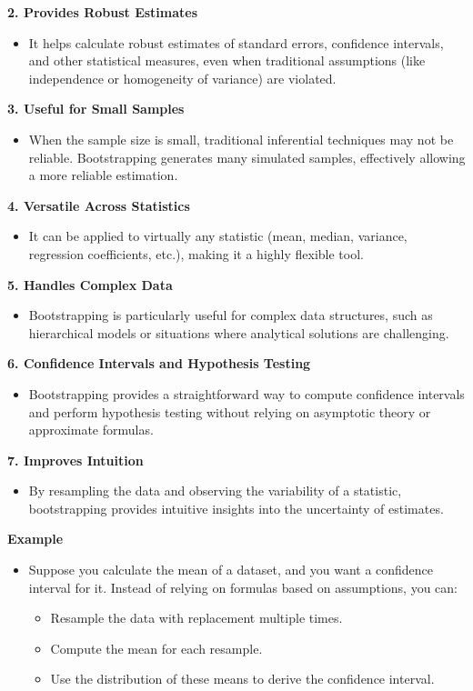 \begin{enumerate}
\textbf{2. Provides Robust Estimates}
\begin{itemize}
    \item It helps calculate robust estimates of standard errors, confidence intervals, and other statistical measures, even when traditional assumptions (like independence or homogeneity of variance) are violated.
\end{itemize}

\textbf{3. Useful for Small Samples}
\begin{itemize}
    \item When the sample size is small, traditional inferential techniques may not be reliable. Bootstrapping generates many simulated samples, effectively allowing a more reliable estimation.
\end{itemize}

\textbf{4. Versatile Across Statistics}
\begin{itemize}
    \item It can be applied to virtually any statistic (mean, median, variance, regression coefficients, etc.), making it a highly flexible tool.
\end{itemize}

\textbf{5. Handles Complex Data}
\begin{itemize}
    \item Bootstrapping is particularly useful for complex data structures, such as hierarchical models or situations where analytical solutions are challenging.
\end{itemize}

\textbf{6. Confidence Intervals and Hypothesis Testing}
\begin{itemize}
    \item Bootstrapping provides a straightforward way to compute confidence intervals and perform hypothesis testing without relying on asymptotic theory or approximate formulas.
\end{itemize}

\textbf{7. Improves Intuition}
\begin{itemize}
    \item By resampling the data and observing the variability of a statistic, bootstrapping provides intuitive insights into the uncertainty of estimates.
\end{itemize}

\textbf{Example}
\begin{itemize}
    \item Suppose you calculate the mean of a dataset, and you want a confidence interval for it. Instead of relying on formulas based on assumptions, you can:
    \begin{itemize}
        \item Resample the data with replacement multiple times.
        \item Compute the mean for each resample.
        \item Use the distribution of these means to derive the confidence interval.
    \end{itemize}
\end{itemize}


\end{enumerate}
